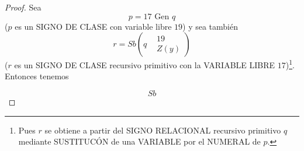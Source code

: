 \begin{proof}
    Sea 
    \begin{equation} \label{eq:TeoVI-11}
        p = 17 \text{ Gen } q
    \end{equation}
    ($p$ es un SIGNO DE CLASE con variable libre $19$) y sea también
    \begin{equation} \label{eq:TeoVI-12}
        r = Sb \left(q 
        \begin{aligned}
            &19 \\
            &Z(y)
        \end{aligned}
        \right)
    \end{equation}
    ($r$ es un SIGNO DE CLASE recursivo primitivo con la VARIABLE LIBRE $17$)\footnote{Pues $r$ se obtiene a partir del SIGNO RELACIONAL recursivo primitivo
    $q$ mediante SUSTITUCÓN de una VARIABLE por el NUMERAL de $p$.}. Entonces tenemos

    \begin{equation}
        Sb
    \end{equation}

\end{proof}
\endinput


